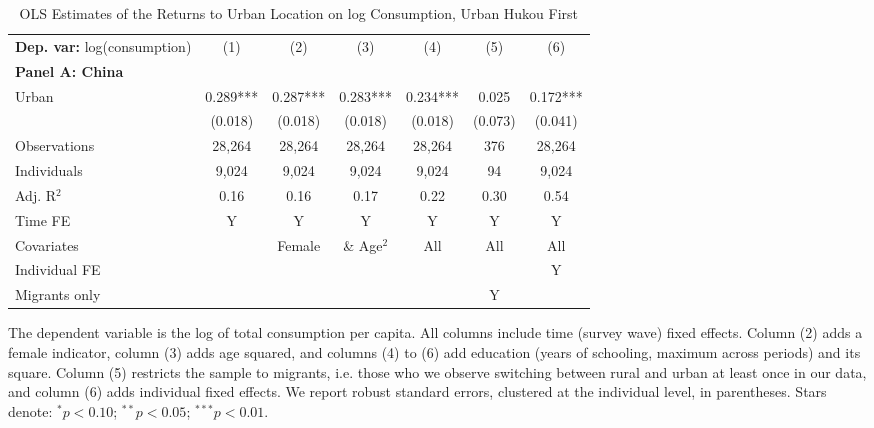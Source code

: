 \begin{table}[htbp] \centering \begin{threeparttable}
 \caption{OLS Estimates of the Returns to Urban Location on log Consumption, Urban Hukou First} 
 \label{tab:OLS_CHN_hukou_urban_first_consumption_urban_unb} 
\begin{tabular}{l cccccc} \toprule  \textbf{Dep. var:}  log(consumption) 
                    &\multicolumn{1}{c}{(1)}   &\multicolumn{1}{c}{(2)}   &\multicolumn{1}{c}{(3)}   &\multicolumn{1}{c}{(4)}   &\multicolumn{1}{c}{(5)}   &\multicolumn{1}{c}{(6)}   \\
\textbf{Panel A: China} \\
Urban               &       0.289***&       0.287***&       0.283***&       0.234***&       0.025   &       0.172***\\
                    &     (0.018)   &     (0.018)   &     (0.018)   &     (0.018)   &     (0.073)   &     (0.041)   \\
\addlinespace
Observations        &      28,264   &      28,264   &      28,264   &      28,264   &         376   &      28,264   \\
Individuals         &       9,024   &       9,024   &       9,024   &       9,024   &          94   &       9,024   \\
Adj. R$^{2}$        &        0.16   &        0.16   &        0.17   &        0.22   &        0.30   &        0.54   \\
\cmidrule{2 -7} Time FE & Y & Y & Y & Y & Y & Y \\ Covariates & & Female & \& Age$^2$ & All & All & All \\ Individual FE & & & & & & Y \\ Migrants only & & & & & Y & \\ \bottomrule \end{tabular} \begin{tablenotes}[flushleft] \footnotesize \item{The dependent variable is the log of total consumption per capita. All columns include time (survey wave) fixed effects. Column (2) adds a female indicator, column (3) adds age squared, and columns (4) to (6) add education (years of schooling, maximum across periods) and its square. Column (5) restricts the sample to migrants, i.e. those who we observe switching between rural and urban at least once in our data, and column (6) adds individual fixed effects. We report robust standard errors, clustered at the individual level, in parentheses. Stars denote: $^{*} p<0.10$; $^{**} p<0.05$; $^{***} p<0.01$.} \end{tablenotes} \end{threeparttable} \end{table}
